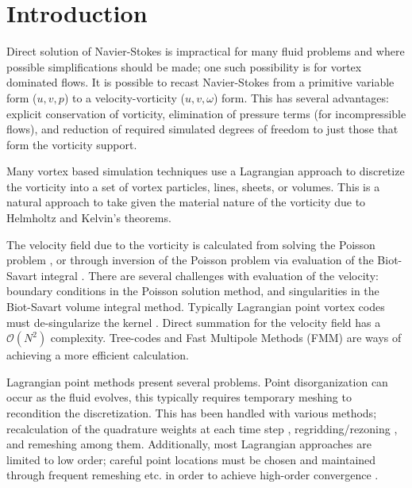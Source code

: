 \documentclass[]{aiaa-tc}%
\begin{document}
\section{Introduction}
Direct solution of Navier-Stokes is impractical for many fluid problems and where possible simplifications should be made; one such possibility is for vortex dominated flows. It is possible to recast Navier-Stokes from a primitive variable form ($u,v,p$) to a velocity-vorticity ($u,v,\omega$) form. This has several advantages: explicit conservation of vorticity, elimination of pressure terms (for incompressible flows), and reduction of required simulated degrees of freedom to just those that form the vorticity support.

Many vortex based simulation techniques use a Lagrangian approach to discretize the vorticity into a set of vortex particles\cite{Point4}, lines\cite{Line4}, sheets\cite{Sheet1}, or volumes\cite{Volumes1}. This is a natural approach to take given the material nature of the vorticity due to Helmholtz and Kelvin's theorems.

The velocity field due to the vorticity is calculated from solving the Poisson problem \cite{MiscMeth1}, or through inversion of the Poisson problem via evaluation of the Biot-Savart integral \cite{Saffman1992}. There are several challenges with evaluation of the velocity: boundary conditions in the Poisson solution method, and singularities in the Biot-Savart volume integral method. Typically Lagrangian point vortex codes must de-singularize the kernel \cite{Rosenhead1930,Moore1972}. Direct summation for the velocity field has a $\mathcal{O}(N^2)$ complexity. Tree-codes \cite{LindsayKrasny2001} and Fast Multipole Methods (FMM) \cite{Strain1997} are ways of achieving a more efficient calculation.

Lagrangian point methods present several problems. Point disorganization can occur as the fluid evolves, this typically requires temporary meshing to recondition the discretization. This has been handled with various methods; recalculation of the quadrature weights at each time step \cite{Remesh2,Remesh3}, regridding/rezoning \cite{Remesh4}, and remeshing \cite{Remesh5} among them. Additionally, most Lagrangian approaches are limited to low order; careful point locations must be chosen and maintained through frequent remeshing etc. in order to achieve high-order convergence \cite{Strain1997}.
\end{document}
